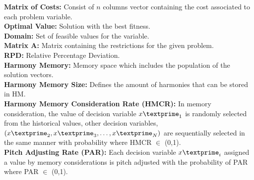 \textbf{Matrix of Costs:} 
Consist of $n$ columns vector containing the cost associated to each problem variable.\\

\textbf{Optimal Value:} 
Solution with the best fitness.\\

\textbf{Domain:} 
Set of feasible values for the variable.\\

\textbf{Matrix A:} 
Matrix containing the restrictions for the given problem.\\

\textbf{RPD:} 
Relative Percentage Deviation.\\

\textbf{Harmony Memory:} 
Memory space which includes the population of the solution vectors.\\

\textbf{Harmony Memory Size:} 
Defines the amount of harmonies that can be stored in HM.\\

\textbf{Harmony Memory Consideration Rate (HMCR):} 
In memory consideration, the value of decision variable ${x\textprime}_1$ is randomly selected from the historical values, other decision variables, $({x\textprime}_2, {x\textprime}_3,\dots,{x\textprime}_N)$ are sequentially selected in the same manner with probability where HMCR $\in$ (0,1).\\

\textbf{Pitch Adjusting Rate (PAR):} 
Each decision variable ${x\textprime}_i$ assigned a value by memory considerations is pitch adjusted with the probability of PAR where PAR $\in$ (0,1).\\


